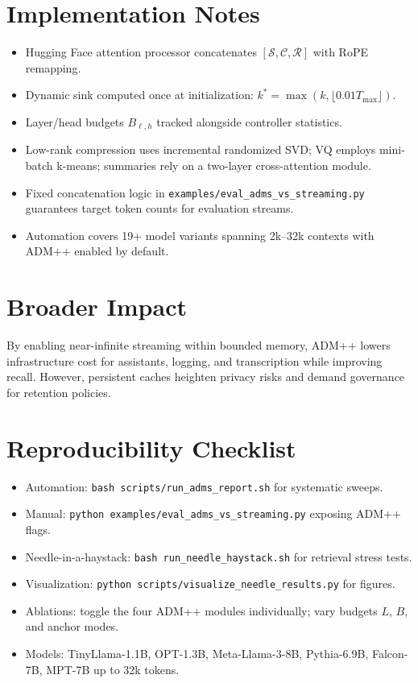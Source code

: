 \documentclass[11pt]{article}
\newcommand{\admpp}{\textsc{ADM++}}
\newcommand{\sink}{\mathcal{S}}
\newcommand{\recent}{\mathcal{R}}
\newcommand{\compressed}{\mathcal{C}}
\begin{document}
\section{Implementation Notes}
\begin{itemize}
  \item Hugging Face attention processor concatenates $[\sink, \compressed, \recent]$ with RoPE remapping.
  \item Dynamic sink computed once at initialization: $k^* = \max(k, \lfloor 0.01 T_{\max} \rfloor)$.
  \item Layer/head budgets $B_{\ell,h}$ tracked alongside controller statistics.
  \item Low-rank compression uses incremental randomized SVD; VQ employs mini-batch k-means; summaries rely on a two-layer cross-attention module.
  \item Fixed concatenation logic in \texttt{examples/eval\_adms\_vs\_streaming.py} guarantees target token counts for evaluation streams.
  \item Automation covers 19+ model variants spanning 2k--32k contexts with ADM++ enabled by default.
\end{itemize}

\section{Broader Impact}
By enabling near-infinite streaming within bounded memory, \admpp{} lowers infrastructure cost for assistants, logging, and transcription while improving recall.
However, persistent caches heighten privacy risks and demand governance for retention policies.

\section*{Reproducibility Checklist}
\begin{itemize}
  \item Automation: \texttt{bash scripts/run\_adms\_report.sh} for systematic sweeps.
  \item Manual: \texttt{python examples/eval\_adms\_vs\_streaming.py} exposing ADM++ flags.
  \item Needle-in-a-haystack: \texttt{bash run\_needle\_haystack.sh} for retrieval stress tests.
  \item Visualization: \texttt{python scripts/visualize\_needle\_results.py} for figures.
  \item Ablations: toggle the four ADM++ modules individually; vary budgets $L$, $B$, and anchor modes.
  \item Models: TinyLlama-1.1B, OPT-1.3B, Meta-Llama-3-8B, Pythia-6.9B, Falcon-7B, MPT-7B up to 32k tokens.
\end{itemize}
\end{document}
